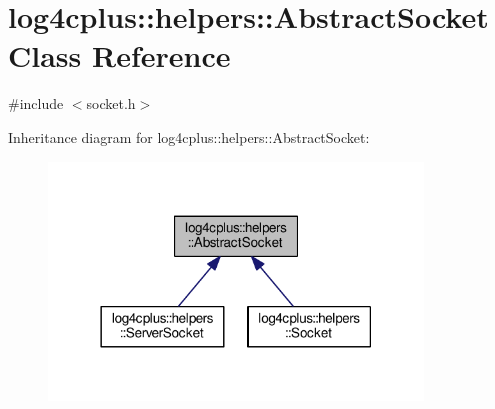 \hypertarget{classlog4cplus_1_1helpers_1_1AbstractSocket}{\section{log4cplus\-:\-:helpers\-:\-:Abstract\-Socket Class Reference}
\label{classlog4cplus_1_1helpers_1_1AbstractSocket}
}


{\ttfamily \#include $<$socket.\-h$>$}



Inheritance diagram for log4cplus\-:\-:helpers\-:\-:Abstract\-Socket\-:
\nopagebreak
\begin{figure}[H]
\begin{center}
\leavevmode
\includegraphics[width=282pt]{classlog4cplus_1_1helpers_1_1AbstractSocket__inherit__graph}
\end{center}
\end{figure}
